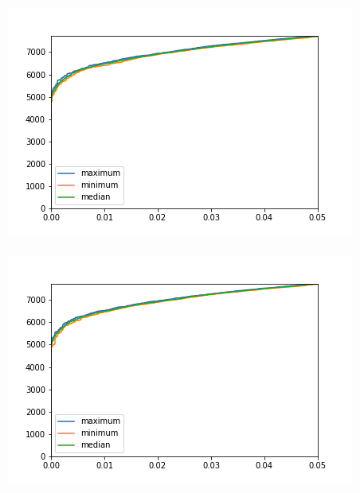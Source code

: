 \renewcommand{\baselinestretch}{0.9}
\begin{figure}
	\normalsize
	\centering
	\begin{subfigure}{0.49 \textwidth}
		\includegraphics[width = \textwidth]{figures/MaxMinMedian_no_balancing.png}
		\caption{}
		\label{fig:results:maxminmedian_not_maintained}
	\end{subfigure}
	\hfill
	\begin{subfigure}{0.49 \textwidth}
		\includegraphics[width = \textwidth]{figures/MaxMinMedian_balancing.png}
		\caption{}
		\label{fig:results:maxminmedian_maintained}
	\end{subfigure}
	\caption[Results of maintaining the proportions of classes in the dataset]{}
	\label{fig:results:maxminmedian}
\end{figure}
\renewcommand{\baselinestretch}{1}


